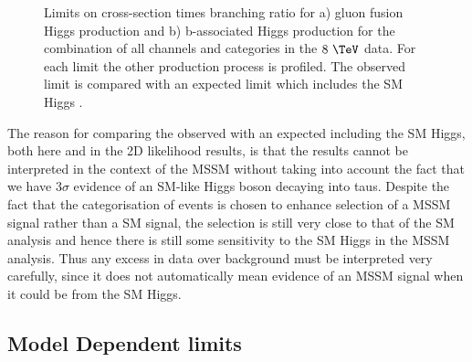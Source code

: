 \begin{figure}[tbh]
\caption{Limits on cross-section times branching ratio for a) gluon fusion Higgs
production and b) b-associated Higgs production for the combination of all
channels and categories in the $8~\TeV$ data. For each limit the other production process is
profiled. The observed limit is compared with an expected limit which includes
the SM Higgs \cite{HIG-13-021}.}
\label{fig:mssmModelIndependent}
\end{figure}

The reason for comparing the observed with an expected including the \ac{SM}
Higgs, both here and in the 2D likelihood results, 
is that the results cannot be interpreted in the context of the \ac{MSSM} without taking into account
the fact that we have $3\sigma$ evidence of an \ac{SM}-like Higgs boson decaying
into taus. Despite the fact that the categorisation of events is chosen to
enhance selection of a \ac{MSSM} signal rather than a \ac{SM} signal, the
selection is still very close to that of the \ac{SM} analysis and hence there is
still some sensitivity to the \ac{SM} Higgs in the \ac{MSSM} analysis. Thus any
excess in data over background must be interpreted very carefully, since it
does not automatically mean evidence of an \ac{MSSM} signal when it could be
from the \ac{SM} Higgs. 

\subsection{Model Dependent limits}
\label{sec:modeldependent}

